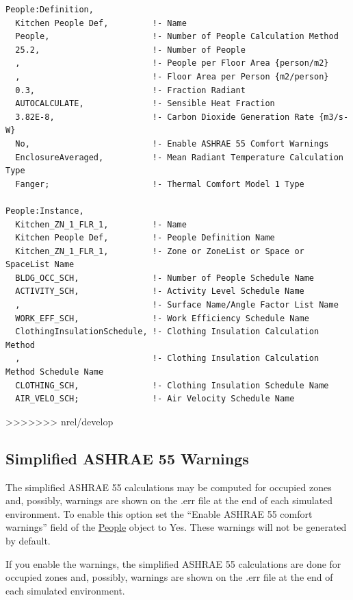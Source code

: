 \begin{lstlisting}
People:Definition,
  Kitchen People Def,         !- Name
  People,                     !- Number of People Calculation Method
  25.2,                       !- Number of People
  ,                           !- People per Floor Area {person/m2}
  ,                           !- Floor Area per Person {m2/person}
  0.3,                        !- Fraction Radiant
  AUTOCALCULATE,              !- Sensible Heat Fraction
  3.82E-8,                    !- Carbon Dioxide Generation Rate {m3/s-W}
  No,                         !- Enable ASHRAE 55 Comfort Warnings
  EnclosureAveraged,          !- Mean Radiant Temperature Calculation Type
  Fanger;                     !- Thermal Comfort Model 1 Type

People:Instance,
  Kitchen_ZN_1_FLR_1,         !- Name
  Kitchen People Def,         !- People Definition Name
  Kitchen_ZN_1_FLR_1,         !- Zone or ZoneList or Space or SpaceList Name
  BLDG_OCC_SCH,               !- Number of People Schedule Name
  ACTIVITY_SCH,               !- Activity Level Schedule Name
  ,                           !- Surface Name/Angle Factor List Name
  WORK_EFF_SCH,               !- Work Efficiency Schedule Name
  ClothingInsulationSchedule, !- Clothing Insulation Calculation Method
  ,                           !- Clothing Insulation Calculation Method Schedule Name
  CLOTHING_SCH,               !- Clothing Insulation Schedule Name
  AIR_VELO_SCH;               !- Air Velocity Schedule Name
\end{lstlisting}

>>>>>>> nrel/develop
\subsection{Simplified ASHRAE 55 Warnings}\label{simplified-ashrae-55-warnings}

The simplified ASHRAE 55 calculations may be computed for occupied zones and, possibly, warnings are shown on the .err file at the end of each simulated environment. To enable this option set the ``Enable ASHRAE 55 comfort warnings'' field of the \hyperref[people]{People} object to Yes. These warnings will not be generated by default.

If you enable the warnings, the simplified ASHRAE 55 calculations are done for occupied zones and, possibly, warnings are shown on the .err file at the end of each simulated environment.

